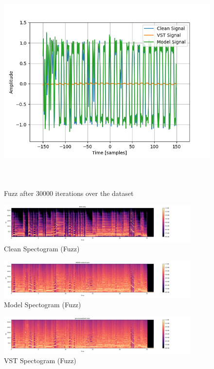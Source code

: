 \documentclass{l4proj}
\begin{document}
\begin{figure}
\centering
\includegraphics[width=6.00000in,height=4.50000in]{images/fuzz.png}
\caption{Fuzz after 30000 iterations over the dataset\label{fig:fuzz}}
\end{figure}

\begin{figure}
\centering
\includegraphics[width=4.00000in]{images/fuzzclean.png}
\caption{Clean Spectogram (Fuzz)\label{fig:fuzzc}}
\end{figure}

\begin{figure}
\centering
\includegraphics[width=4.00000in]{images/fuzzmodel.png}
\caption{Model Spectogram (Fuzz)\label{fig:fuzzm}}
\end{figure}

\begin{figure}
\centering
\includegraphics[width=4.00000in]{images/fuzzvst.png}
\caption{VST Spectogram (Fuzz)\label{fig:fuzzv}}
\end{figure}
\end{document}
